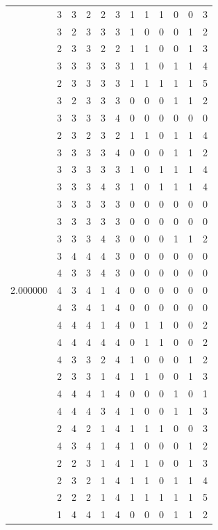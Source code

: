 \documentclass[]{book}
\theoremstyle{definition}
\theoremstyle{definition}
\theoremstyle{definition}
\theoremstyle{remark}
\begin{document}
\begin{table}
{\begin{tabular}[t]{rrrrrrrrrrrr}
 & 3 & 3 & 2 & 2 & 3 & 1 & 1 & 1 & 0 & 0 & 3\\
 & 3 & 2 & 3 & 3 & 3 & 1 & 0 & 0 & 0 & 1 & 2\\
 & 2 & 3 & 3 & 2 & 2 & 1 & 1 & 0 & 0 & 1 & 3\\
 & 3 & 3 & 3 & 3 & 3 & 1 & 1 & 0 & 1 & 1 & 4\\
 & 2 & 3 & 3 & 3 & 3 & 1 & 1 & 1 & 1 & 1 & 5\\
 & 3 & 2 & 3 & 3 & 3 & 0 & 0 & 0 & 1 & 1 & 2\\
 & 3 & 3 & 3 & 3 & 4 & 0 & 0 & 0 & 0 & 0 & 0\\
 & 2 & 3 & 2 & 3 & 2 & 1 & 1 & 0 & 1 & 1 & 4\\
 & 3 & 3 & 3 & 3 & 4 & 0 & 0 & 0 & 1 & 1 & 2\\
 & 3 & 3 & 3 & 3 & 3 & 1 & 0 & 1 & 1 & 1 & 4\\
 & 3 & 3 & 3 & 4 & 3 & 1 & 0 & 1 & 1 & 1 & 4\\
 & 3 & 3 & 3 & 3 & 3 & 0 & 0 & 0 & 0 & 0 & 0\\
 & 3 & 3 & 3 & 3 & 3 & 0 & 0 & 0 & 0 & 0 & 0\\
 & 3 & 3 & 3 & 4 & 3 & 0 & 0 & 0 & 1 & 1 & 2\\
 & 3 & 4 & 4 & 4 & 3 & 0 & 0 & 0 & 0 & 0 & 0\\
 & 4 & 3 & 3 & 4 & 3 & 0 & 0 & 0 & 0 & 0 & 0\\
2.000000 & 4 & 3 & 4 & 1 & 4 & 0 & 0 & 0 & 0 & 0 & 0\\
 & 4 & 3 & 4 & 1 & 4 & 0 & 0 & 0 & 0 & 0 & 0\\
 & 4 & 4 & 4 & 1 & 4 & 0 & 1 & 1 & 0 & 0 & 2\\
 & 4 & 4 & 4 & 4 & 4 & 0 & 1 & 1 & 0 & 0 & 2\\
 & 4 & 3 & 3 & 2 & 4 & 1 & 0 & 0 & 0 & 1 & 2\\
 & 2 & 3 & 3 & 1 & 4 & 1 & 1 & 0 & 0 & 1 & 3\\
 & 4 & 4 & 4 & 1 & 4 & 0 & 0 & 0 & 1 & 0 & 1\\
 & 4 & 4 & 4 & 3 & 4 & 1 & 0 & 0 & 1 & 1 & 3\\
 & 2 & 4 & 2 & 1 & 4 & 1 & 1 & 1 & 0 & 0 & 3\\
 & 4 & 3 & 4 & 1 & 4 & 1 & 0 & 0 & 0 & 1 & 2\\
 & 2 & 2 & 3 & 1 & 4 & 1 & 1 & 0 & 0 & 1 & 3\\
 & 2 & 3 & 2 & 1 & 4 & 1 & 1 & 0 & 1 & 1 & 4\\
 & 2 & 2 & 2 & 1 & 4 & 1 & 1 & 1 & 1 & 1 & 5\\
 & 1 & 4 & 4 & 1 & 4 & 0 & 0 & 0 & 1 & 1 & 2\\

\end{tabular}}
\end{table}
\end{document}
